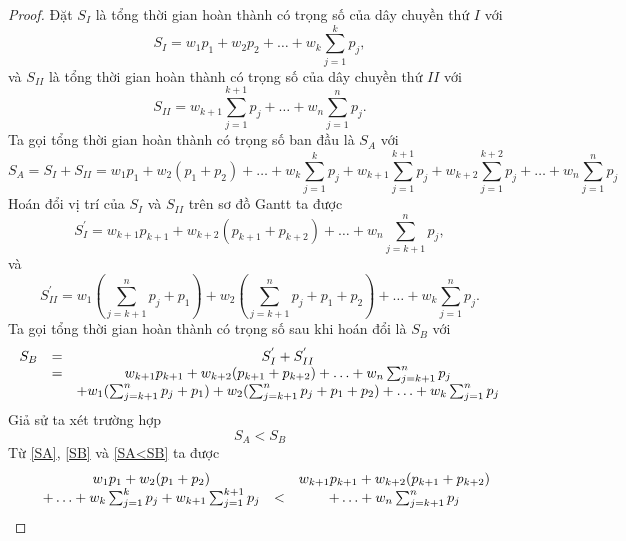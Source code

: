 \documentclass[12pt,a4paper]{report}
\begin{document}
\begin{proof}
	Đặt $S_I$ là tổng thời gian hoàn thành có trọng số của dây chuyền thứ $I$ với
	\begin{equation}
		S_I = w_1 p_1 + w_2 p_2 + \ldots + w_k \sum_{j=1}^k p_j,
	\end{equation}
	và $S_{II}$ là tổng thời gian hoàn thành có trọng số của dây chuyền thứ $II$ với
	\begin{equation}
		S_{II} = w_{k+1} \sum_{j=1}^{k+1} p_j + \ldots + w_n \sum_{j=1}^{n} p_j.
	\end{equation}
	Ta gọi tổng thời gian hoàn thành có trọng số ban đầu là $S_A$ với
	\begin{equation} \label{SA}
		S_A = S_I + S_{II} = w_1 p_1 + w_2 (p_1 + p_2) + \ldots + w_k \sum_{j=1}^k p_j + w_{k+1} \sum_{j=1}^{k+1} p_j + w_{k+2} \sum_{j=1}^{k+2} p_j + \ldots + w_n \sum_{j=1}^{n} p_j
	\end{equation}
	Hoán đổi vị trí của $S_I$ và $S_{II}$ trên sơ đồ Gantt ta được
	\begin{equation}
		S_I^{'} = w_{k+1} p_{k+1} + w_{k+2}(p_{k+1} + p_{k+2}) + \ldots + w_n \sum_{j=k+1}^{n} p_j,
	\end{equation}
	và
	\begin{equation}
		S_{II}^{'} = w_1(\sum_{j=k+1}^{n}p_j+p_1) + w_2(\sum_{j=k+1}^{n}p_j+p_1+p_2) + \ldots + w_k\sum_{j=1}^{n} p_j.
	\end{equation}
	Ta gọi tổng thời gian hoàn thành có trọng số sau khi hoán đổi là $S_B$ với
	\begin{equation} \label{SB}
		\begin{array}{c c c}
		S_B &=& S_I^{'} + S_{II}^{'} \\
		&=& w_{k+1} p_{k+1} + w_{k+2}(p_{k+1} + p_{k+2}) + \ldots + w_n \sum_{j=k+1}^{n} p_j \\
		&& + w_1(\sum_{j=k+1}^{n}p_j+p_1) + w_2(\sum_{j=k+1}^{n}p_j+p_1+p_2) + \ldots + w_k\sum_{j=1}^{n} p_j
		\end{array}
	\end{equation}
	Giả sử ta xét trường hợp
	\begin{equation} \label{SA<SB}
		S_A < S_B
	\end{equation}
	Từ \eqref{SA}, \eqref{SB} và \eqref{SA<SB} ta được
	\begin{equation*}
	\begin{array}{c c c c}
	& w_1 p_1 + w_2 (p_1 + p_2)  && w_{k+1} p_{k+1} + w_{k+2}(p_{k+1} + p_{k+2}) \\

	& + \ldots + w_k \sum_{j=1}^k p_j + w_{k+1} \sum_{j=1}^{k+1} p_j &<& + \ldots + w_n \sum_{j=k+1}^{n} p_j \\
	

\end{array}
\end{equation*}
\end{proof}
\end{document}
